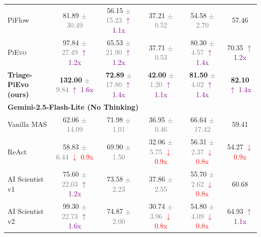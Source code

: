 \documentclass{article}
\newcommand{\pievo}{\textsc{PiEvo}\,}
\begin{document}
\begin{table}[!ht]
{\begin{tabular}{l | cccc | c}
PiFlow & 81.89 \textcolor{gray}{\scriptsize $\pm$ 30.49} & 56.15 \textcolor{gray}{\scriptsize $\pm$ 15.23} \textcolor{purple}{\scriptsize $\uparrow$ 1.1x} & 37.21 \textcolor{gray}{\scriptsize $\pm$ 0.52} & 54.58 \textcolor{gray}{\scriptsize $\pm$ 2.70} & 57.46  \\
\pievo{} & 97.84 \textcolor{gray}{\scriptsize $\pm$ 27.49} \textcolor{purple}{\scriptsize $\uparrow$ 1.2x} & 65.53 \textcolor{gray}{\scriptsize $\pm$ 21.90} \textcolor{purple}{\scriptsize $\uparrow$ 1.2x} & 37.71 \textcolor{gray}{\scriptsize $\pm$ 0.53} & 80.30 \textcolor{gray}{\scriptsize $\pm$ 4.57} \textcolor{purple}{\scriptsize $\uparrow$ 1.4x} & 70.35  \textcolor{purple}{\scriptsize $\uparrow$ 1.2x} \\
\textbf{Triage-PiEvo (ours)} & \textbf{132.00} \textcolor{gray}{\scriptsize $\pm$ 9.84} \textcolor{purple}{\scriptsize $\uparrow$ 1.6x} & \textbf{72.89} \textcolor{gray}{\scriptsize $\pm$ 17.80} \textcolor{purple}{\scriptsize $\uparrow$ 1.4x} & \textbf{42.00} \textcolor{gray}{\scriptsize $\pm$ 1.20} \textcolor{purple}{\scriptsize $\uparrow$ 1.1x} & \textbf{81.50} \textcolor{gray}{\scriptsize $\pm$ 4.02} \textcolor{purple}{\scriptsize $\uparrow$ 1.4x} & \textbf{82.10}  \textcolor{purple}{\scriptsize $\uparrow$ 1.4x} \\
\midrule
\multicolumn{6}{l}{\textbf{Gemini-2.5-Flash-Lite (No Thinking)}} \\
\midrule
Vanilla MAS & 62.06 \textcolor{gray}{\scriptsize $\pm$ 14.09} & 71.98 \textcolor{gray}{\scriptsize $\pm$ 1.01} & 36.95 \textcolor{gray}{\scriptsize $\pm$ 0.46} & 66.64 \textcolor{gray}{\scriptsize $\pm$ 17.42} & 59.41  \\
ReAct & 58.83 \textcolor{gray}{\scriptsize $\pm$ 6.44} \textcolor{red}{\scriptsize $\downarrow$ 0.9x} & 69.90 \textcolor{gray}{\scriptsize $\pm$ 1.50} & 32.06 \textcolor{gray}{\scriptsize $\pm$ 5.75} \textcolor{red}{\scriptsize $\downarrow$ 0.9x} & 56.31 \textcolor{gray}{\scriptsize $\pm$ 2.37} \textcolor{red}{\scriptsize $\downarrow$ 0.8x} & 54.27  \textcolor{red}{\scriptsize $\downarrow$ 0.9x} \\
AI Scientist v1 & 75.60 \textcolor{gray}{\scriptsize $\pm$ 22.03} \textcolor{purple}{\scriptsize $\uparrow$ 1.2x} & 73.58 \textcolor{gray}{\scriptsize $\pm$ 2.23} & 37.86 \textcolor{gray}{\scriptsize $\pm$ 2.55} & 55.70 \textcolor{gray}{\scriptsize $\pm$ 2.62} \textcolor{red}{\scriptsize $\downarrow$ 0.8x} & 60.68  \\
AI Scientist v2 & 99.30 \textcolor{gray}{\scriptsize $\pm$ 22.73} \textcolor{purple}{\scriptsize $\uparrow$ 1.6x} & 74.87 \textcolor{gray}{\scriptsize $\pm$ 2.00} & 30.74 \textcolor{gray}{\scriptsize $\pm$ 3.96} \textcolor{red}{\scriptsize $\downarrow$ 0.8x} & 54.80 \textcolor{gray}{\scriptsize $\pm$ 4.09} \textcolor{red}{\scriptsize $\downarrow$ 0.8x} & 64.93  \textcolor{purple}{\scriptsize $\uparrow$ 1.1x} \\

\end{tabular}}
\end{table}
\end{document}
